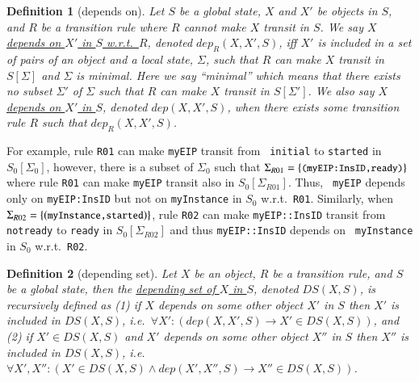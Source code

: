 \documentclass[12pt]{report}
\newtheorem{definition}{Definition}
\newcommand{\ra}{\rightarrow}
\newcommand{\mbstt}[1]{\mbox{\small{\tt {#1}}}}
\newcommand{\ul}{\underline}
\begin{document}
\begin{definition}[depends on]
Let $S$ be a global state, $X$ and $X'$ be objects in $S$, and $R$ be
a transition rule where $R$ cannot make $X$ transit in $S$.  We say
\ul{$X$ depends on $X'$ in $S$ w.r.t.\ $R$}, denoted \ul{$dep_R(X,
  X',S)$}, iff $X'$ is included in a set of pairs of an object and a
local state, $\Sigma$, such that $R$ can make $X$ transit in
$S[\Sigma]$ and $\Sigma$ is minimal.  Here we say ``minimal'' which
means that there exists no subset $\Sigma'$ of $\Sigma$ such that $R$
can make $X$ transit in $S[\Sigma']$. We also say \ul{$X$ depends on
  $X'$ in $S$}, denoted \ul{$dep(X, X',S)$}, when there exists some
transition rule $R$ such that $dep_R(X,X',S)$.
\end{definition}
For example, rule {\tt R01} can make {\tt myEIP} transit from {\tt
  initial} to {\tt started} in $S_0[\Sigma_0]$, however, there is a
subset of $\Sigma_0$ such that
$\Sigma_{R01}=\{\mbstt{(myEIP:InsID,ready)}\}$ where rule {\tt R01}
can make {\tt myEIP} transit also in $S_0[\Sigma_{R01}]$. Thus, {\tt
  myEIP} depends only on {\tt myEIP:InsID} but not on {\tt myInstance}
in $S_0$ w.r.t.\ {\tt R01}. Similarly, when
$\Sigma_{R02}=\{(\mbstt{myInstance,started})\}$, rule {\tt R02} can
make {\tt myEIP::InsID} transit from {\tt notready} to {\tt ready} in
$S_0[\Sigma_{R02}]$ and thus {\tt myEIP::InsID} depends on {\tt
  myInstance} in $S_0$ w.r.t.\ {\tt R02}.

\begin{definition}[depending set]
Let $X$ be an object, $R$ be a transition rule, and $S$ be a global
state, then the \ul{depending set of $X$ in $S$}, denoted
\ul{$DS(X,S)$}, is recursively defined as (1) if $X$ depends on some
other object $X'$ in $S$ then $X'$ is included in
$DS(X,S)$, i.e.\ $\forall X': (dep(X,X',S) \ra X'\in DS(X,S))$, and
(2) if $X' \in DS(X,S)$ and $X'$ depends on some other object $X''$
in $S$ then $X''$ is included in $DS(X,S)$, i.e.\ $\forall
X',X'': (X'\in DS(X,S) \land dep(X',X'',S) \ra X''\in DS(X,S))$.
\end{definition}
\end{document}
